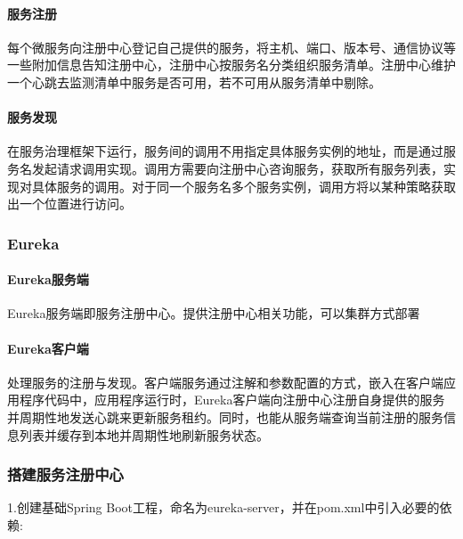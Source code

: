 \documentclass[letterpaper,10pt,english]{sphinxmanual}
\begin{document}
\paragraph{服务注册}
\label{\detokenize{01.spring-cloud/02.eureka/eureka_01:id2}}
每个微服务向注册中心登记自己提供的服务，将主机、端口、版本号、通信协议等一些附加信息告知注册中心，注册中心按服务名分类组织服务清单。注册中心维护一个心跳去监测清单中服务是否可用，若不可用从服务清单中剔除。


\paragraph{服务发现}
\label{\detokenize{01.spring-cloud/02.eureka/eureka_01:id3}}
在服务治理框架下运行，服务间的调用不用指定具体服务实例的地址，而是通过服务名发起请求调用实现。调用方需要向注册中心咨询服务，获取所有服务列表，实现对具体服务的调用。对于同一个服务名多个服务实例，调用方将以某种策略获取出一个位置进行访问。


\subsubsection{Eureka}
\label{\detokenize{01.spring-cloud/02.eureka/eureka_01:eureka}}

\paragraph{Eureka服务端}
\label{\detokenize{01.spring-cloud/02.eureka/eureka_01:id4}}
Eureka服务端即服务注册中心。提供注册中心相关功能，可以集群方式部署


\paragraph{Eureka客户端}
\label{\detokenize{01.spring-cloud/02.eureka/eureka_01:id5}}
处理服务的注册与发现。客户端服务通过注解和参数配置的方式，嵌入在客户端应用程序代码中，应用程序运行时，Eureka客户端向注册中心注册自身提供的服务并周期性地发送心跳来更新服务租约。同时，也能从服务端查询当前注册的服务信息列表并缓存到本地并周期性地刷新服务状态。


\subsubsection{搭建服务注册中心}
\label{\detokenize{01.spring-cloud/02.eureka/eureka_02:id1}}\label{\detokenize{01.spring-cloud/02.eureka/eureka_02::doc}}
1.创建基础Spring Boot工程，命名为eureka-server，并在pom.xml中引入必要的依赖:
\end{document}
